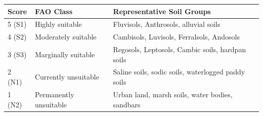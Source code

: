 \begin{tabular}{l l l}
\hline
\textbf{Score} & \textbf{FAO Class} & \textbf{Representative Soil Groups} \\
\hline
5 (S1) & Highly suitable 
& Fluvisols, Anthrosols, alluvial soils \\
4 (S2) & Moderately suitable 
& Cambisols, Luvisols, Ferralsols, Andosols \\
3 (S3) & Marginally suitable 
& Regosols, Leptosols, Cambic soils, hardpan soils \\
2 (N1) & Currently unsuitable 
& Saline soils, sodic soils, waterlogged paddy soils \\
1 (N2) & Permanently unsuitable 
& Urban land, marsh soils, water bodies, sandbars \\
\hline
\end{tabular}